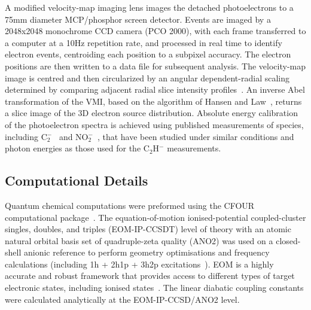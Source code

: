 \documentclass[aip,graphicx]{revtex4-1}
\begin{document}
A modified velocity-map imaging lens images the detached photoelectrons to a 75mm diameter MCP/phosphor screen detector. Events are imaged by a 2048x2048 monochrome CCD camera (PCO 2000), with each frame transferred to a computer at a 10Hz repetition rate, and processed in real time to identify electron events, centroiding each position to
a subpixel accuracy. The electron positions are then written to a data file for subsequent analysis. The velocity-map image is centred and then circularized by an angular dependent-radial scaling determined by comparing adjacent radial slice intensity profiles~\cite{gas17}. An inverse Abel transformation of the VMI, based on the algorithm of Hansen and Law~\cite{han85,hic19}, returns a slice image of the 3D electron source distribution. Absolute energy calibration of the photoelectron spectra is achieved using published measurements of species, including C$_2^-$~\cite{law19b} and NO$_2^-$~\cite{law19}, that have been studied under similar conditions and photon energies as those used for the C$_2$H$^-$ measurements.

\subsection{Computational Details}
Quantum chemical computations were preformed using the CFOUR computational package~\cite{dev20}. The equation-of-motion ionised-potential coupled-cluster singles, doubles, and triples (EOM-IP-CCSDT) level of theory with an atomic natural orbital basis set of quadruple-zeta quality (ANO2) was used on a closed-shell anionic reference to perform geometry optimisations and frequency calculations (including 1h + 2h1p + 3h2p excitations~\cite{mat16}). EOM is a highly accurate and robust framework that provides access to different types of target electronic states, including ionised states~\cite{gul21b,and22,bar07}. The linear diabatic coupling constants were calculated analytically at the EOM-IP-CCSD/ANO2 level.
\end{document}
